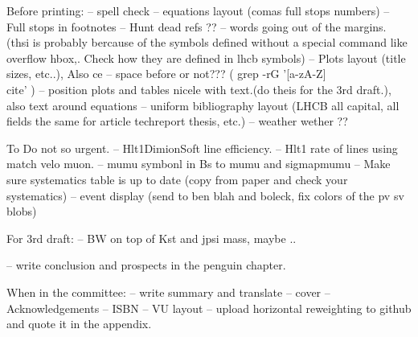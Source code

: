Before printing:
-- spell check
-- equations layout (comas full stops numbers)
-- Full stops in footnotes
-- Hunt dead refs ??
-- words going out of the margins. (thsi is probably bercause of the symbols defined without a special command like overflow hbox,. Check how they are defined in lhcb symbols)
-- Plots layout (title sizes, etc..), Also ce
-- space before \cite{} or not??? ( grep -rG  '[a-zA-Z]\\cite' )
-- position plots and tables nicele with text.(do theis for the 3rd draft.), also text around equations
-- uniform bibliography layout (LHCB all capital, all fields the same for article techreport thesis, etc.)
-- weather wether ??

To Do not so urgent.
-- Hlt1DimionSoft line efficiency.
-- Hlt1 rate of lines using match velo muon.
-- mumu symbonl in Bs to mumu and sigmapmumu
-- Make sure systematics table is up to date (copy from paper and check your systematics)
-- event display (send to ben blah and boleck, fix colors of the pv sv blobs)

For 3rd draft:
-- BW on top of Kst and jpsi mass, maybe ..

-- write conclusion and prospects in the penguin chapter.

When in the committee:
-- write summary and translate
-- cover
-- Acknowledgements
-- ISBN
-- VU layout
-- upload horizontal reweighting to github and quote it in the appendix.

